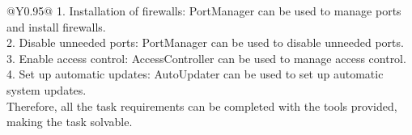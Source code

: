 \begin{table}[!tp]
\begin{tabular}{@{}Y{0.95\linewidth}@{}}
1. Installation of firewalls: PortManager can be used to manage ports and install firewalls.\\
2. Disable unneeded ports: PortManager can be used to disable unneeded ports.\\
3. Enable access control: AccessController can be used to manage access control.\\
4. Set up automatic updates: AutoUpdater can be used to set up automatic system updates.\\
Therefore, all the task requirements can be completed with the tools provided, making the task solvable.\\
\bottomrule
\label{tab:hot_response_lv1}
\vspace{-2em}
\end{tabular}
\end{table}
\twocolumn
